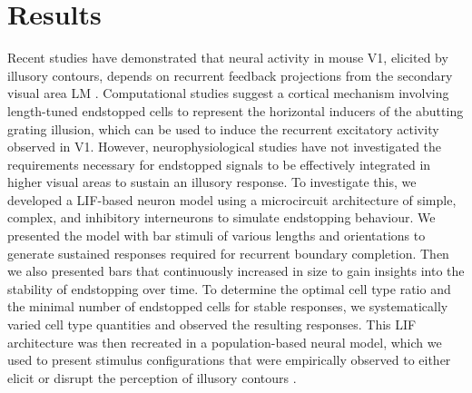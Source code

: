 \documentclass[12pt]{article}
\begin{document}
\section*{Results}
\setlength{\parindent}{24pt}
Recent studies have demonstrated that neural activity in mouse V1, elicited by illusory contours, depends on recurrent feedback projections from the secondary visual area LM  \autocite{shinRecurrentPatternCompletion2023}. Computational studies suggest a cortical mechanism involving length-tuned endstopped cells to represent the horizontal inducers of the abutting grating illusion, which can be used to induce the recurrent excitatory activity observed in V1. However, neurophysiological studies have not investigated the requirements necessary for endstopped signals to be effectively integrated in higher visual areas to sustain an illusory response. To investigate this, we developed a LIF-based neuron model using a microcircuit architecture of simple, complex, and inhibitory interneurons to simulate endstopping behaviour. We presented the model with bar stimuli of various lengths and orientations to generate sustained responses required for recurrent boundary completion. Then we also presented bars that continuously increased in size to gain insights into the stability of endstopping over time. To determine the optimal cell type ratio and the minimal number of endstopped cells for stable responses, we systematically varied cell type quantities and observed the resulting responses. This LIF architecture was then recreated in a population-based neural model, which we used to present stimulus configurations that were empirically observed to either elicit or disrupt the perception of illusory contours \autocite{vonderheydtMechanismsContourPerception1989}. 
\setlength{\parindent}{0pt}
\end{document}
